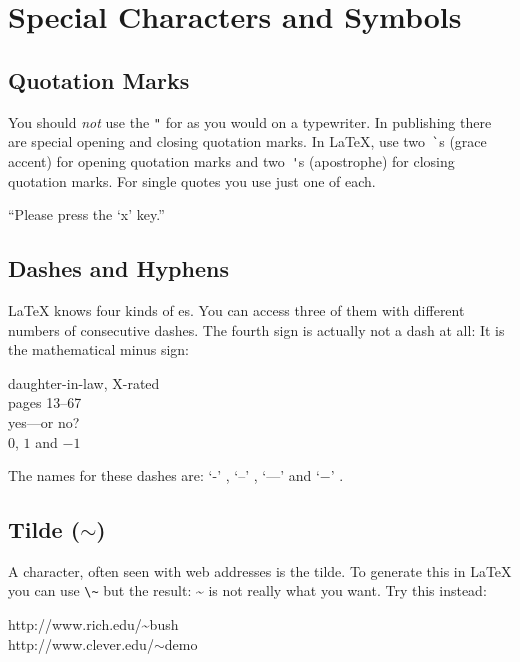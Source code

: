 \section{Special Characters and Symbols}
 
\subsection{Quotation Marks}

You should \emph{not} use the \verb|"| for 
 as you would on a typewriter.  In publishing
there are special opening and closing quotation marks.  In \LaTeX{},
use two~\verb|`|s (grace accent) for opening quotation marks and
two~\verb|'|s (apostrophe) for closing quotation marks. For single
quotes you use just one of each.
\begin{example}
``Please press the `x' key.''
\end{example}
 
\subsection{Dashes and Hyphens}

\LaTeX{} knows four kinds of es. You can access three of
them with different numbers of consecutive dashes. The fourth sign
is actually not a dash at all: It is the mathematical minus sign: \index{-}
\index{--} \index{---}  

\begin{example}
daughter-in-law, X-rated\\
pages 13--67\\
yes---or no? \\
$0$, $1$ and $-1$
\end{example}
The names for these dashes are: 
`-' , `--' , `---'  and
`$-$' .

\subsection{Tilde ($\sim$)}
A character, often seen with web addresses is the tilde. To generate
this in \LaTeX{} you can use \verb|\~| but the result: \~{} is not really
what you want. Try this instead:

\begin{example}
http://www.rich.edu/\~{}bush \\
http://www.clever.edu/$\sim$demo
\end{example}  
 
